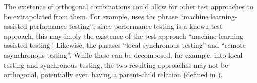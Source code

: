     The existence of orthogonal combinations could allow for other test
    approaches to be extrapolated from them. For example, \citet{Moghadam2019}
    uses the phrase ``machine learning-assisted performance testing''; since
    performance testing is a known test approach, this may imply the existence
    of the test approach ``machine learning-assisted testing''. Likewise,
    \citet{JardEtAl1999}  the phrases ``local synchronous
    testing'' and ``remote asynchronous testing''. While these can be
    decomposed, for example, into local testing and synchronous testing,
    the two resulting approaches may not be orthogonal, potentially even having
    a parent-child relation (defined in ).

\fi
